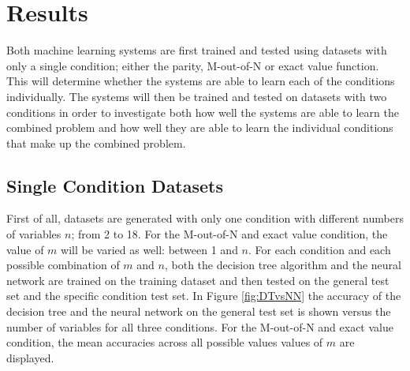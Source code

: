 \documentclass[letterpaper]{article} %
\begin{document}

\section{Results}

Both machine learning systems are first trained and tested using datasets with only a single condition; either the parity, M-out-of-N or exact value function. This will determine whether the systems are able to learn each of the conditions individually. The systems will then be trained and tested on datasets with two conditions in order to investigate both how well the systems are able to learn the combined problem and how well they are able to learn the individual conditions that make up the combined problem.

\subsection{Single Condition Datasets}
First of all, datasets are generated with only one condition with different numbers of variables $n$; from 2 to 18.  For the M-out-of-N and exact value condition, the value of $m$ will be varied as well: between 1 and $n$. For each condition and each possible combination of $m$ and $n$, both the decision tree algorithm and the neural network are trained on the training dataset and then tested on the general test set and the specific condition test set. In Figure \ref{fig:DTvsNN} the accuracy of the decision tree and the neural network on the general test set is shown versus the number of variables for all three conditions. For the M-out-of-N and exact value condition, the mean accuracies across all possible values values of $m$ are displayed.
\end{document}
